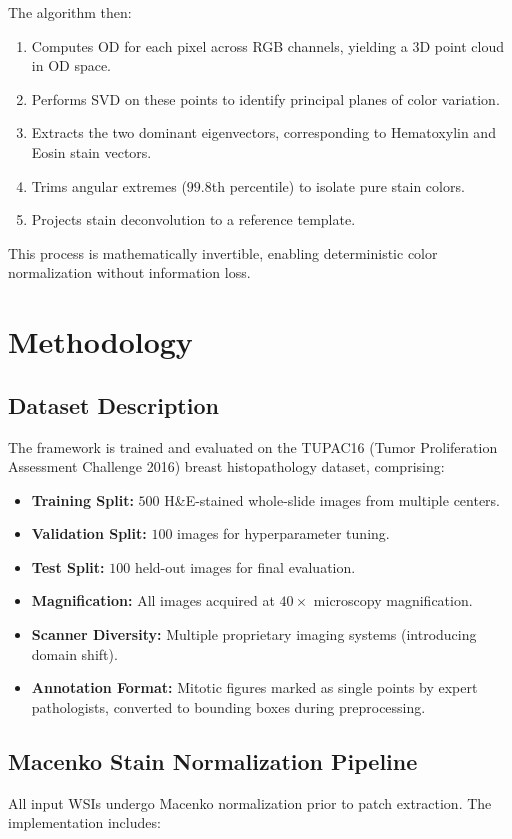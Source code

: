 \documentclass[journal]{IEEEtran}
\begin{document}
The algorithm then:
\begin{enumerate}
\item Computes OD for each pixel across RGB channels, yielding a 3D point cloud in OD space.
\item Performs SVD on these points to identify principal planes of color variation.
\item Extracts the two dominant eigenvectors, corresponding to Hematoxylin and Eosin stain vectors.
\item Trims angular extremes ($99.8$th percentile) to isolate pure stain colors.
\item Projects stain deconvolution to a reference template.
\end{enumerate}

This process is mathematically invertible, enabling deterministic color normalization without information loss.

\section{Methodology}

\subsection{Dataset Description}
The framework is trained and evaluated on the TUPAC16 (Tumor Proliferation Assessment Challenge 2016) breast histopathology dataset, comprising:

\begin{itemize}
\item \textbf{Training Split:} $500$ H\&E-stained whole-slide images from multiple centers.
\item \textbf{Validation Split:} $100$ images for hyperparameter tuning.
\item \textbf{Test Split:} $100$ held-out images for final evaluation.
\item \textbf{Magnification:} All images acquired at $40 \times$ microscopy magnification.
\item \textbf{Scanner Diversity:} Multiple proprietary imaging systems (introducing domain shift).
\item \textbf{Annotation Format:} Mitotic figures marked as single points by expert pathologists, converted to bounding boxes during preprocessing.
\end{itemize}

\subsection{Macenko Stain Normalization Pipeline}
All input WSIs undergo Macenko normalization prior to patch extraction. The implementation includes:
\end{document}
